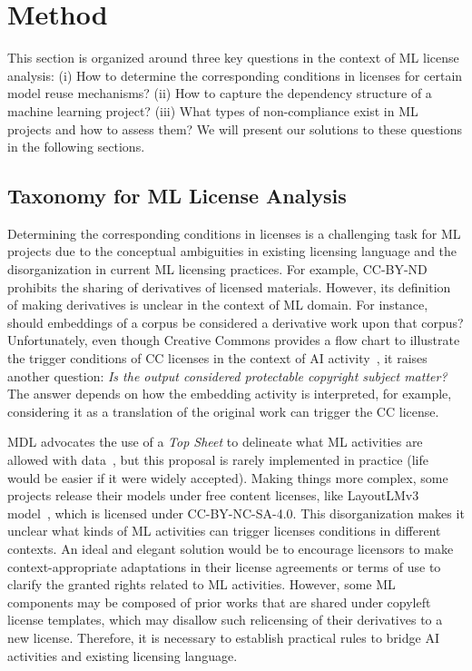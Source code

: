 \section{Method}
This section is organized around three key questions in the context of ML license analysis: (i) How to determine the corresponding conditions in licenses for certain model reuse mechanisms? (ii) How to capture the dependency structure of a machine learning project? (iii) What types of non-compliance exist in ML projects and how to assess them?
We will present our solutions to these questions in the following sections.

\subsection{Taxonomy for ML License Analysis}
Determining the corresponding conditions in licenses is a challenging task for ML projects due to the conceptual ambiguities in existing licensing language and the disorganization in current ML licensing practices.
For example, CC-BY-ND prohibits the sharing of derivatives of licensed materials.
However, its definition of making derivatives is unclear in the context of ML domain.
For instance, should embeddings of a corpus be considered a derivative work upon that corpus?
Unfortunately, even though Creative Commons provides a flow chart to illustrate the trigger conditions of CC licenses in the context of AI activity~\cite{creative2023artificial}, it raises another question: \textit{Is the output considered protectable copyright subject matter?}
The answer depends on how the embedding activity is interpreted, for example, considering it as a translation of the original work can trigger the CC license.

MDL advocates the use of a \textit{Top Sheet} to delineate what ML activities are allowed with data~\cite{benjamin2019towards}, but this proposal is rarely implemented in practice (life would be easier if it were widely accepted). 
Making things more complex, some projects release their models under free content licenses, like LayoutLMv3 model~\cite{huang2022layoutlmv3}, which is licensed under CC-BY-NC-SA-4.0. 
This disorganization makes it unclear what kinds of ML activities can trigger licenses conditions in different contexts.
An ideal and elegant solution would be to encourage licensors to make context-appropriate adaptations in their license agreements or terms of use to clarify the granted rights related to ML activities. 
However, some ML components may be composed of prior works that are shared under copyleft license templates, which may disallow such relicensing of their derivatives to a new license.
Therefore, it is necessary to establish practical rules to bridge AI activities and existing licensing language.

